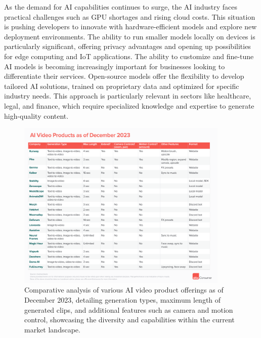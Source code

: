 \documentclass[11pt,a4paper,oneside]{report}
\begin{document}
As the demand for AI capabilities continues to surge, the AI industry faces practical challenges such as GPU shortages and rising cloud costs. 
This situation is pushing developers to innovate with hardware-efficient models and explore new deployment environments.
The ability to run smaller models locally on devices is particularly significant, offering privacy advantages and opening up possibilities for edge computing and IoT applications. 
The ability to customize and fine-tune AI models is becoming increasingly important for businesses looking to differentiate their services. 
Open-source models offer the flexibility to develop tailored AI solutions, trained on proprietary data and optimized for specific industry needs. 
This approach is particularly relevant in sectors like healthcare, legal, and finance, which require specialized knowledge and expertise to generate high-quality content.

\begin{figure}[htbp]
  \centering
  \includegraphics[width=0.9\textwidth]{products.png}
  \caption{Comparative analysis of various AI video product offerings as of December 2023, detailing generation types, maximum length of generated clips, and additional features such as camera and motion control, showcasing the diversity and capabilities within the current market landscape.\cite{a16zAI2023}}
\end{figure}
\end{document}
